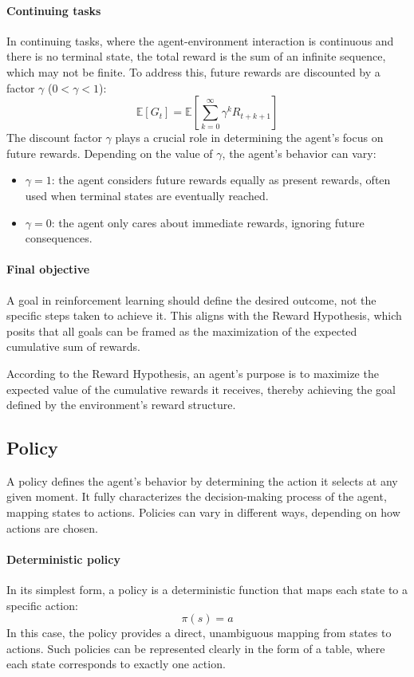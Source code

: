 \paragraph*{Continuing tasks}
In continuing tasks, where the agent-environment interaction is continuous and there is no terminal state, the total reward is the sum of an infinite sequence, which may not be finite. 
To address this, future rewards are discounted by a factor $\gamma$ ($0 < \gamma < 1$): 
\[\mathbb{E}\left[G_t\right]=\mathbb{E}\left[\sum_{k=0}^{\infty}\gamma^kR_{t+k+1}\right]\]
The discount factor $\gamma$ plays a crucial role in determining the agent's focus on future rewards.
Depending on the value of $\gamma$, the agent's behavior can vary:
\begin{itemize}
    \item $\gamma = 1$: the agent considers future rewards equally as present rewards, often used when terminal states are eventually reached.
    \item $\gamma = 0$: the agent only cares about immediate rewards, ignoring future consequences. 
\end{itemize}

\paragraph*{Final objective}
A goal in reinforcement learning should define the desired outcome, not the specific steps taken to achieve it. 
This aligns with the Reward Hypothesis, which posits that all goals can be framed as the maximization of the expected cumulative sum of rewards.

According to the Reward Hypothesis, an agent's purpose is to maximize the expected value of the cumulative rewards it receives, thereby achieving the goal defined by the environment's reward structure.

\subsection{Policy}
A policy defines the agent's behavior by determining the action it selects at any given moment. 
It fully characterizes the decision-making process of the agent, mapping states to actions. 
Policies can vary in different ways, depending on how actions are chosen.

\paragraph*{Deterministic policy}
In its simplest form, a policy is a deterministic function that maps each state to a specific action:
\[\pi(s)=a\]
In this case, the policy provides a direct, unambiguous mapping from states to actions.
Such policies can be represented clearly in the form of a table, where each state corresponds to exactly one action.

